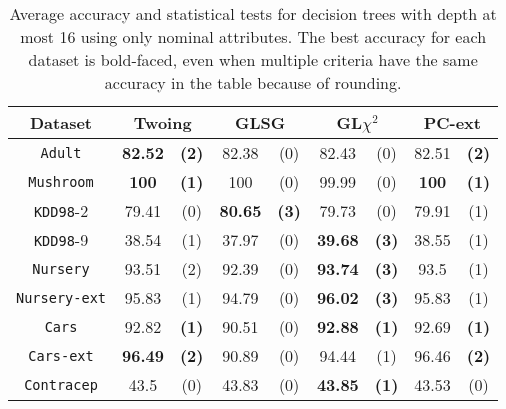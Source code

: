 \begin{table}
\small
\caption{Average accuracy and statistical tests  for  decision trees 
with depth at most 16 using only nominal attributes. The best accuracy for each dataset is bold-faced, even when multiple criteria have the same accuracy in the table because of rounding.}
\centering
\begin{tabular}{c|cc|cc|cc|cc} 
Dataset             & \multicolumn{2}{c|}{Twoing} &  \multicolumn{2}{c|}{GLSG}  & \multicolumn{2}{c|}{GL$\chi^2$} & \multicolumn{2}{c}{PC-ext}\\ \hline
{\tt Adult}         &  {\bf 82.52} & {\bf (2)}    &  82.38       &  (0)         &  82.43       & (0)              & 82.51      & {\bf (2)}    \\
{\tt Mushroom}      &  {\bf 100}   & {\bf (1)}    &  100         &  (0)         &  99.99       & (0)              & {\bf 100 } & {\bf (1)}    \\
{\tt KDD98}-2       &  79.41       & (0)          &  {\bf 80.65} & {\bf (3)}    &  79.73       & (0)              & 79.91      & (1)          \\
{\tt KDD98}-9       &  38.54       & (1)          &  37.97       & (0)          &  {\bf 39.68} & {\bf (3)}        & 38.55      & (1)          \\
{\tt Nursery}       &  93.51       & (2)          &  92.39       & (0)          &  {\bf 93.74} & {\bf (3)}        & 93.5       & (1)          \\
{\tt Nursery-ext}   &  95.83       & (1)          &  94.79       & (0)          &  {\bf 96.02} & {\bf (3)}        & 95.83      & (1)          \\
{\tt Cars}          &  92.82       & {\bf (1)}    &  90.51       & (0)          &  {\bf 92.88} & {\bf (1)}        & 92.69      & {\bf (1)}    \\
{\tt Cars-ext}      &  {\bf 96.49} & {\bf (2)}    &  90.89       & (0)          &  94.44       & (1)              & 96.46      & {\bf (2)}    \\
{\tt Contracep}     &  43.5        & (0)          &  43.83       & (0)          &  {\bf 43.85} & {\bf (1)}        & 43.53      & (0)          \\

\end{tabular}
\end{table}
